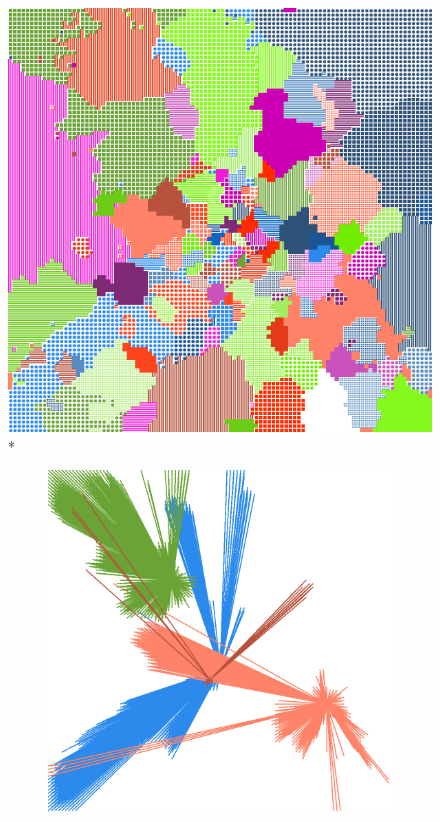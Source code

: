 \documentclass[12pt,a4paper]{article}
\begin{document}
\begin{figure}[H]
\centering
\includegraphics[width=0.8\linewidth]{weekDef/6Sat.png}
\\*
\begin{subfigure}[b]{0.3\textwidth}
\includegraphics[width=\textwidth]{weekDef/edges-6Sat-big.png}
\end{subfigure}
\begin{subfigure}[b]{0.3\textwidth}

\end{subfigure}
\end{figure}
\end{document}
